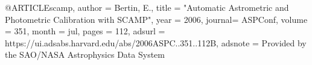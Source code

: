 
@ARTICLE{scamp,
   author = {{Bertin}, E.},
    title = "{Automatic Astrometric and Photometric Calibration with SCAMP}",
     year = 2006,
   journal= {ASPConf},
   volume = 351,
    month = jul,
    pages = {112},
   adsurl = {https://ui.adsabs.harvard.edu/abs/2006ASPC..351..112B},
  adsnote = {Provided by the SAO/NASA Astrophysics Data System}
}
